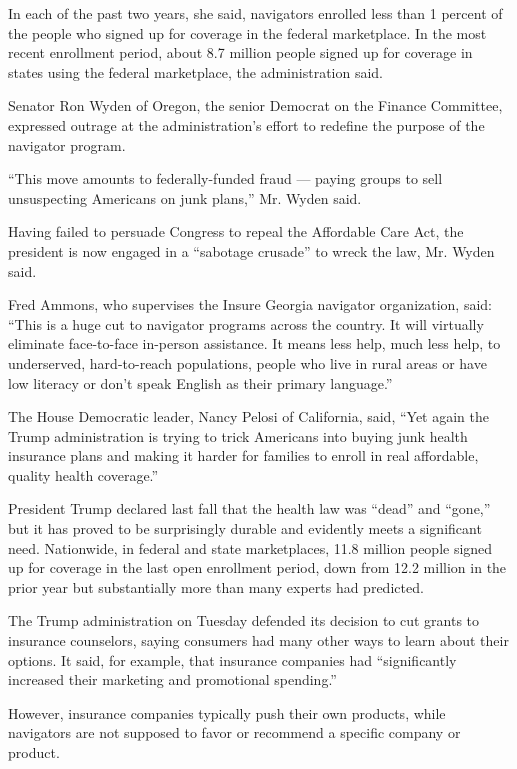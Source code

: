 In each of the past two years, she said, navigators enrolled less than 1
percent of the people who signed up for coverage in the federal
marketplace. In the most recent enrollment period, about 8.7 million
people signed up for coverage in states using the federal marketplace,
the administration said.

Senator Ron Wyden of Oregon, the senior Democrat on the Finance
Committee, expressed outrage at the administration's effort to redefine
the purpose of the navigator program.

``This move amounts to federally-funded fraud --- paying groups to sell
unsuspecting Americans on junk plans,'' Mr. Wyden said.

Having failed to persuade Congress to repeal the Affordable Care Act,
the president is now engaged in a ``sabotage crusade'' to wreck the law,
Mr. Wyden said.

Fred Ammons, who supervises the Insure Georgia navigator organization,
said: ``This is a huge cut to navigator programs across the country. It
will virtually eliminate face-to-face in-person assistance. It means
less help, much less help, to underserved, hard-to-reach populations,
people who live in rural areas or have low literacy or don't speak
English as their primary language.''

The House Democratic leader, Nancy Pelosi of California, said, ``Yet
again the Trump administration is trying to trick Americans into buying
junk health insurance plans and making it harder for families to enroll
in real affordable, quality health coverage.''

President Trump declared last fall that the health law was ``dead'' and
``gone,'' but it has proved to be surprisingly durable and evidently
meets a significant need. Nationwide, in federal and state marketplaces,
11.8 million people signed up for coverage in the last open enrollment
period, down from 12.2 million in the prior year but substantially more
than many experts had predicted.

The Trump administration on Tuesday defended its decision to cut grants
to insurance counselors, saying consumers had many other ways to learn
about their options. It said, for example, that insurance companies had
``significantly increased their marketing and promotional spending.''

However, insurance companies typically push their own products, while
navigators are not supposed to favor or recommend a specific company or
product.

